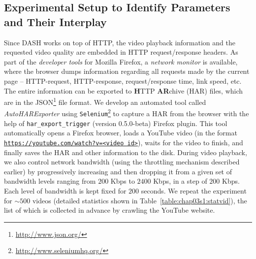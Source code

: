 \subsection{Experimental Setup to Identify Parameters and Their Interplay} 
Since DASH works on top of HTTP, the video playback information and the requested video quality are embedded in HTTP request/response headers.
As part of the {\em developer tools} for Mozilla Firefox, a {\em network monitor} is available, where the browser dumps information regarding all requests made by the current page -- HTTP-request, HTTP-response, request/response time, link speed, etc.
The entire information can be exported to {\bf H}TTP {\bf AR}chive (HAR) files, which are in the JSON\footnote{\url{http://www.json.org/}} file format.
We develop an automated tool called {\em AutoHARExporter} using \texttt{Selenium}\footnote{\url{http://www.seleniumhq.org/}} to capture a HAR from the browser with the help of \texttt{har\_export\_trigger} (version 0.5.0-beta) Firefox plugin.
This tool automatically opens a Firefox browser, loads a YouTube video (in the format {\tt \url{https://youtube.com/watch?v=<video id>}}), waits for the video to finish, and finally saves the HAR and other information to the disk.
During video playback, we also control network bandwidth (using the throttling mechanism described earlier) by progressively increasing and then dropping it from a given set of bandwidth levels ranging from $200$ Kbps to $2400$ Kbps, in a step of $200$ Kbps.
Each level of bandwidth is kept fixed for $200$ seconds. 
We repeat the experiment for $\sim500$ videos (detailed statistics shown in Table~\ref{table:chap03s1:statvid}), the list of which is collected in advance by crawling the YouTube website.

